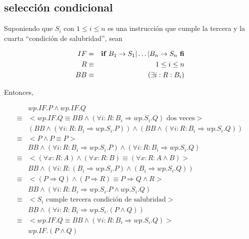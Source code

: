 \documentclass{article}
\begin{document}
\subsection{selección condicional}

Suponiendo que $S_i$ con $1 \leq i \leq n$ es una instrucción que
cumple la tercera y la cuarta ``condición de salubridad'',
sean

\begin{align*}
IF & = & \text{{\bf if }} B_1 \rightarrow S_1 | \ldots | B_n \rightarrow S_n \text{ {\bf fi}}  \\
R & \equiv & 1 \leq i \leq n \\
BB & \equiv & (\exists i : R : B_i) \\
\end{align*}

Entonces,

\begin{align*}
 & wp.IF.P \wedge wp.IF.Q \\
 \equiv & <wp.IF.Q \equiv BB \wedge (\forall i : R : B_i \Rightarrow wp.S_i.Q) \text{ dos veces}> \\
 & (BB \wedge (\forall i : R : B_i \Rightarrow wp.S_i.P)) \wedge (BB \wedge (\forall i : R : B_i \Rightarrow wp.S_i.Q)) \\
 \equiv & <P \wedge P \equiv P> \\
 & BB \wedge (\forall i : R : B_i \Rightarrow wp.S_i.P) \wedge (\forall i : R : B_i \Rightarrow wp.S_i.Q) \\
 \equiv & <(\forall x : R : A) \wedge (\forall x : R : B) \equiv (\forall x : R : A \wedge B)> \\
 & BB \wedge (\forall i : R : (B_i \Rightarrow wp.S_i.P) \wedge (B_i \Rightarrow wp.S_i.Q)) \\
 \equiv & <(P \Rightarrow Q) \wedge (P \Rightarrow R) \equiv P \Rightarrow Q \wedge R> \\
 & BB \wedge (\forall i : R : B_i \Rightarrow wp.S_i.P \wedge wp.S_i.Q) \\
 \equiv & <S_i \text{ cumple tercera condición de salubridad}> \\
 & BB \wedge (\forall i : R : B_i \Rightarrow wp.S_i.(P \wedge Q)) \\
 \equiv & <wp.IF.Q \equiv BB \wedge (\forall i : R : B_i \Rightarrow wp.S_i.Q)> \\
 & wp.IF.(P \wedge Q)
\end{align*}
\end{document}
